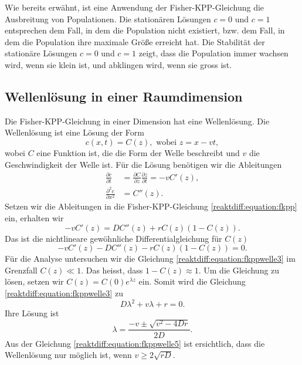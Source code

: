 Wie bereits erwähnt, ist eine Anwendung der Fisher-KPP-Gleichung die Ausbreitung von Populationen.
Die stationären Lösungen \(c = 0\) und \(c = 1\)entsprechen dem Fall, in dem die Population nicht existiert, bzw. dem Fall, in dem die Population ihre maximale Größe erreicht hat.
Die Stabilität der stationäre Lösungen \(c = 0\) und \(c = 1\) zeigt, dass die Population immer wachsen wird, wenn sie klein ist, und abklingen wird, wenn sie gross ist.

\subsection{Wellenlösung in einer Raumdimension
\label{reaktdiff:subsection:fkppwelle}}
Die Fisher-KPP-Gleichung in einer Dimension hat eine Wellenlösung.
Die Wellenlösung ist eine Lösung der Form
\begin{equation*}
\label{reaktdiff:equation:fkppwelle}
c(x,t) = C(z), \text{ wobei } z = x - vt,
\end{equation*}
wobei \(C\) eine Funktion ist, die die Form der Welle beschreibt und \(v\) die Geschwindigkeit der Welle ist.
Für die Lösung benötigen wir die Ableitungen
\begin{align*}
\frac{\partial c}{\partial t} &= \frac{\partial C}{\partial z}\frac{\partial z}{\partial t} = -vC'(z),
\\
\frac{\partial^2 c}{\partial x^2} &= C''(z).
\end{align*}
Setzen wir die Ableitungen in die Fisher-KPP-Gleichung \eqref{reaktdiff:equation:fkpp} ein, erhalten wir
\begin{equation*}
\label{reaktdiff:equation:fkppwelle2}
-vC'(z) = D C''(z) + rC(z)(1-C(z)).
\end{equation*}
Das ist die nichtlineare gewöhnliche Differentialgleichung für \(C(z)\)
\begin{equation}
    \label{reaktdiff:equation:fkppwelle3}
    -vC'(z) - D C''(z) - rC(z)(1-C(z)) = 0.
\end{equation}
Für die Analyse untersuchen wir die Gleichung \eqref{reaktdiff:equation:fkppwelle3} im Grenzfall \(C(z) \ll 1\).
Das heisst, dass \(1 - C(z)\approx 1\).
Um die Gleichung zu lösen, setzen wir \(C(z) = C(0) e^{\lambda z}\) ein.
Somit wird die Gleichung \eqref{reaktdiff:equation:fkppwelle3} zu
\begin{equation*}
D\lambda^2 + v\lambda + r = 0.
\end{equation*}
Ihre Lösung ist
\begin{equation}
\label{reaktdiff:equation:fkppwelle5}
\lambda = \frac{-v \pm \sqrt{v^2 - 4Dr}}{2D}.
\end{equation}
Aus der Gleichung \eqref{reaktdiff:equation:fkppwelle5} ist ersichtlich, dass die Wellenlösung nur möglich ist, wenn \(v \ge 2\sqrt{rD}\).

